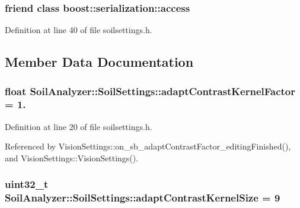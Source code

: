\subsubsection[{boost\+::serialization\+::access}]{\setlength{\rightskip}{0pt plus 5cm}friend class boost\+::serialization\+::access\hspace{0.3cm}{\ttfamily [friend]}}\label{class_soil_analyzer_1_1_soil_settings_ac98d07dd8f7b70e16ccb9a01abf56b9c}


Definition at line 40 of file soilsettings.\+h.



\subsection{Member Data Documentation}
\hypertarget{class_soil_analyzer_1_1_soil_settings_ace12c0f4bc35d420ef528cc390fc2cdb}{}
\subsubsection[{adapt\+Contrast\+Kernel\+Factor}]{\setlength{\rightskip}{0pt plus 5cm}float Soil\+Analyzer\+::\+Soil\+Settings\+::adapt\+Contrast\+Kernel\+Factor = 1.}\label{class_soil_analyzer_1_1_soil_settings_ace12c0f4bc35d420ef528cc390fc2cdb}


Definition at line 20 of file soilsettings.\+h.



Referenced by Vision\+Settings\+::on\+\_\+sb\+\_\+adapt\+Contrast\+Factor\+\_\+editing\+Finished(), and Vision\+Settings\+::\+Vision\+Settings().

\hypertarget{class_soil_analyzer_1_1_soil_settings_a73f627b092dbdbda37b66ef6c2eef95c}{}
\subsubsection[{adapt\+Contrast\+Kernel\+Size}]{\setlength{\rightskip}{0pt plus 5cm}uint32\+\_\+t Soil\+Analyzer\+::\+Soil\+Settings\+::adapt\+Contrast\+Kernel\+Size = 9}\label{class_soil_analyzer_1_1_soil_settings_a73f627b092dbdbda37b66ef6c2eef95c}



